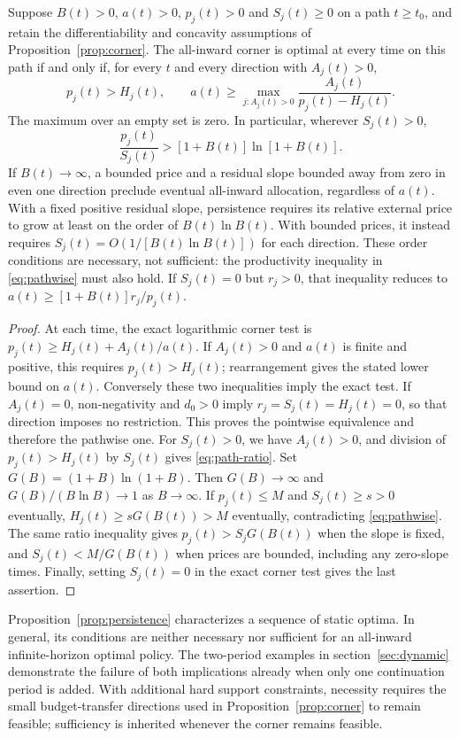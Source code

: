 \begin{proposition}
\label{prop:persistence}
Suppose $B(t)>0$, $a(t)>0$, $p_j(t)>0$ and $S_j(t)\geq0$ on a
path $t\geq t_0$, and retain the differentiability and concavity assumptions
of Proposition~\ref{prop:corner}. The all-inward corner is optimal at every
time on this path if and only if, for every $t$ and every direction with
$A_j(t)>0$,
\begin{equation}
 p_j(t)>H_j(t),\qquad
 a(t)\geq \max_{j:A_j(t)>0}
 \frac{A_j(t)}{p_j(t)-H_j(t)}.
 \label{eq:pathwise}
\end{equation}
The maximum over an empty set is zero. In particular, wherever $S_j(t)>0$,
\begin{equation}
 \frac{p_j(t)}{S_j(t)}>[1+B(t)]\ln[1+B(t)].
 \label{eq:path-ratio}
\end{equation}
If $B(t)\to\infty$, a bounded price and a residual slope bounded away
from zero in even one direction preclude eventual all-inward allocation,
regardless of $a(t)$. With a fixed positive residual slope, persistence
requires its relative external price to grow at least on the order of
$B(t)\ln B(t)$. With bounded prices, it instead requires
$S_j(t)=O(1/[B(t)\ln B(t)])$ for each direction. These order conditions
are necessary, not sufficient: the productivity inequality in
\eqref{eq:pathwise} must also hold. If $S_j(t)=0$ but $r_j>0$, that
inequality reduces to $a(t)\geq[1+B(t)]r_j/p_j(t)$.
\end{proposition}
\begin{proof}
At each time, the exact logarithmic corner test is
$p_j(t)\geq H_j(t)+A_j(t)/a(t)$. If $A_j(t)>0$ and $a(t)$ is
finite and positive, this requires $p_j(t)>H_j(t)$; rearrangement gives
the stated lower bound on $a(t)$. Conversely these two inequalities imply
the exact test. If $A_j(t)=0$, non-negativity and $d_0>0$ imply
$r_j=S_j(t)=H_j(t)=0$, so that direction imposes no restriction.
This proves the pointwise equivalence and therefore the pathwise one.
For $S_j(t)>0$, we have $A_j(t)>0$, and division of $p_j(t)>H_j(t)$
by $S_j(t)$ gives \eqref{eq:path-ratio}. Set
$G(B)=(1+B)\ln(1+B)$. Then $G(B)\to\infty$ and
$G(B)/(B\ln B)\to1$ as $B\to\infty$. If $p_j(t)\leq M$ and
$S_j(t)\geq s>0$ eventually, $H_j(t)\geq sG(B(t))>M$ eventually,
contradicting \eqref{eq:pathwise}. The same ratio inequality gives
$p_j(t)>S_jG(B(t))$ when the slope is fixed, and
$S_j(t)<M/G(B(t))$ when prices are bounded, including any zero-slope
times. Finally, setting $S_j(t)=0$ in the exact corner test gives the
last assertion.
\end{proof}
Proposition~\ref{prop:persistence} characterizes a sequence of static
optima. In general, its conditions are neither necessary nor sufficient
for an all-inward infinite-horizon optimal policy. The two-period examples in
section~\ref{sec:dynamic} demonstrate the failure of both implications
already when only one continuation period is added.
With additional hard support constraints, necessity requires the small
budget-transfer directions used in Proposition~\ref{prop:corner} to remain
feasible; sufficiency is inherited whenever the corner remains feasible.


